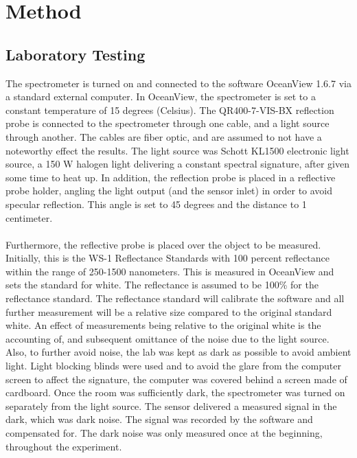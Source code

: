 \chapter{Method}
\label{chap:method}

\section{Laboratory Testing}
The spectrometer is turned on and connected to the software OceanView 1.6.7 via a standard external computer. In OceanView, the spectrometer is set to a constant temperature of 15 degrees (Celsius). The QR400-7-VIS-BX reflection probe is connected to the spectrometer through one cable, and a light source through another. The cables are fiber optic, and are assumed to not have a noteworthy effect the results. The light source was Schott KL1500 electronic light source, a 150 W halogen light delivering a constant spectral signature, after given some time to heat up. In addition, the reflection probe is placed in a reflective probe holder, angling the light output (and the sensor inlet) in order to avoid specular reflection. This angle is set to 45 degrees and the distance to 1 centimeter.
\\\\
Furthermore, the reflective probe is placed over the object to be measured. Initially, this is the WS-1 Reflectance Standards with 100 percent reflectance within the range of 250-1500 nanometers. This is measured in OceanView and sets the standard for white. The reflectance is assumed to be 100\% for the reflectance standard. The reflectance standard will calibrate the software and all further measurement will be a relative size compared to the original standard white. An effect of measurements being relative to the original white is the accounting of, and subsequent omittance of the noise due to the light source. Also, to further avoid noise, the lab was kept as dark as possible to avoid ambient light. Light blocking blinds were used and to avoid the glare from the computer screen to affect the signature, the computer was covered behind a screen made of cardboard. Once the room was sufficiently dark, the spectrometer was turned on separately from the light source. The sensor delivered a measured signal in the dark, which was dark noise. The signal was recorded by the software and compensated for. The dark noise was only measured once at the beginning, throughout the experiment.
\\\\
